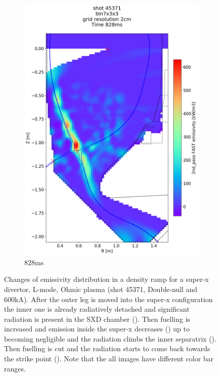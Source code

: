 \begin{figure}[!ht]
\begin{subfigure}{0.395\linewidth}
         \includegraphics[trim={75 40 0 190},clip,width=\textwidth]{Chapters/chapter2/figs/IRVB-MASTU_shot-45371_export_11.png}
         \vspace*{-6.5mm}
         \caption{828ms}
         \label{fig:45371_export2_4}
     \end{subfigure}
    \vspace*{-3mm}
    \caption{Changes of emissivity distribution in a density ramp for a super-x divertor, L-mode, Ohmic plasma (shot 45371, Double-null and 600kA). After the outer leg is moved into the super-x configuration the inner one is already radiatively detached and significant radiation is present in the SXD chamber (). Then fuelling is increased and emission inside the super-x decreases () up to becoming negligible and the radiation climbs the inner separatrix (). Then fuelling is cut and the radiation starts to come back towards the strike point (). Note that the all images have different color bar ranges.}
    \label{fig:45371_export2}
\end{figure}

